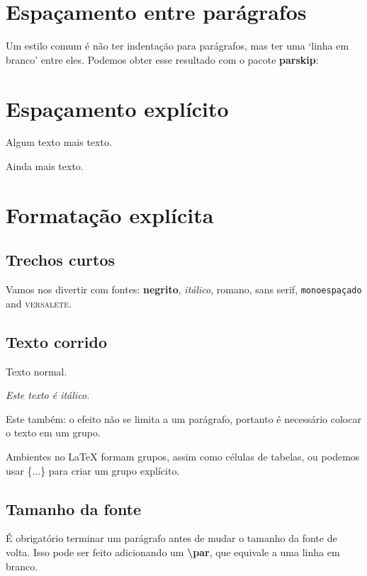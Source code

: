 \documentclass[brazilian, 12pt]{article}
\begin{document}
\section{Espaçamento entre parágrafos}
Um estilo comum é não ter indentação para parágrafos, mas ter uma ‘linha em branco’ entre eles. Podemos obter esse resultado com o pacote \textbf{parskip}: \\[20pt]
\lipsum[1-3]


\section{Espaçamento explícito}
Algum texto \hspace{1cm} mais texto.

\vspace{10cm}

Ainda mais texto.


\section{Formatação explícita}
\subsection{Trechos curtos}
Vamos nos divertir com fontes: \textbf{negrito}, \textit{itálico}, \textrm{romano}, \textsf{sans serif}, \texttt{monoespaçado} and \textsc{versalete}.

\subsection{Texto corrido}
Texto normal.

{\itshape
Este texto é itálico.

Este também:  o efeito não se limita a um parágrafo, portanto é necessário colocar o texto em um grupo.
}

Ambientes no LaTeX formam grupos, assim como células de tabelas, ou podemos usar \{...\} para criar um grupo explícito.

\subsection{Tamanho da fonte}
É obrigatório terminar um parágrafo antes de mudar o tamanho da fonte de volta. Isso pode ser feito adicionando um \textbf{\textbackslash par}, que equivale a uma linha em branco.
\end{document}
